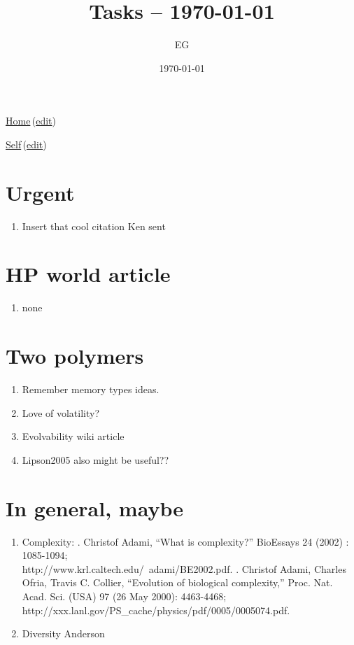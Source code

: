 \documentclass[12pt]{paper}
\title{Tasks  -- \today}
\author{EG}
\date{\today}
\newcommand{\wikilink}[2] { \href{#1.pdf}{#2}\,(\href{#1.tex}{edit})}
\begin{document}
 \maketitle
\wikilink{home}{Home}

\wikilink{tasks}{Self}


\section{Urgent}
\begin{enumerate}
\item Insert that cool citation Ken sent
\end{enumerate}



\section{HP world article}
\begin{enumerate}
 \item none
\end{enumerate}

\section{Two polymers}
\begin{enumerate}
\item Remember memory types ideas.
\item Love of volatility?
 \item Evolvability wiki article
 \item Lipson2005 also might be useful??
\end{enumerate}

\section{In general, maybe}
\begin{enumerate}
\item Complexity:
. Christof Adami, ``What is complexity?''
BioEssays 24 (2002) : 1085-1094; \\
http://www.krl.caltech.edu/~adami/BE2002.pdf.
. Christof Adami, Charles Ofria, Travis C. Collier, “Evolution of biological
complexity,” Proc. Nat. Acad. Sci. (USA) 97 (26 May 2000): 4463-4468; \\
http://xxx.lanl.gov/PS\_cache/physics/pdf/0005/0005074.pdf.
\item Diversity
\subitem Anderson
\end{enumerate}
\end{document}
